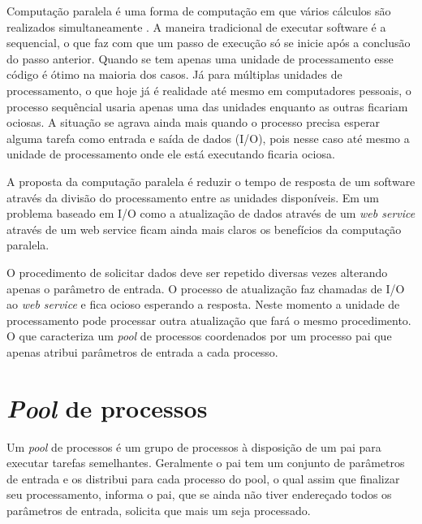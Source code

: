 \label{Cap:computacao_paralela}

Computação paralela é uma forma de computação em que vários cálculos são realizados simultaneamente \cite{ref-computacao-paralela}. A maneira tradicional de executar software é a sequencial, o que faz com que um passo de execução só se inicie após a conclusão do passo anterior. Quando se tem apenas uma unidade de processamento esse código é ótimo na maioria dos casos. Já para múltiplas unidades de processamento, o que hoje já é realidade até mesmo em computadores pessoais, o processo sequêncial usaria apenas uma das unidades enquanto as outras ficariam ociosas. A situação se agrava ainda mais quando o processo precisa esperar alguma tarefa como entrada e saída de dados (I/O), pois nesse caso até mesmo a unidade de processamento onde ele está executando ficaria ociosa.

A proposta da computação paralela é reduzir o tempo de resposta de um software através da divisão do processamento entre as unidades disponíveis. Em um problema baseado em I/O como a atualização de dados através de um \textit{web service} através de um web service ficam ainda mais claros os benefícios da computação paralela. 

O procedimento de solicitar dados deve ser repetido diversas vezes alterando apenas o parâmetro de entrada. O processo de atualização faz chamadas de I/O ao \textit{web service} e fica ocioso esperando a resposta. Neste momento a unidade de processamento pode processar outra atualização que fará o mesmo procedimento. O que caracteriza um \textit{pool} de processos coordenados por um processo pai que apenas atribui parâmetros de entrada a cada processo.

\section{\textit{Pool} de processos}

Um \textit{pool} de processos é um grupo de processos à disposição de um pai para executar tarefas semelhantes. Geralmente o pai tem um conjunto de parâmetros de entrada e os distribui para cada processo do pool, o qual assim que finalizar seu processamento, informa o pai, que se ainda não tiver endereçado todos os parâmetros de entrada, solicita que mais um seja processado.

